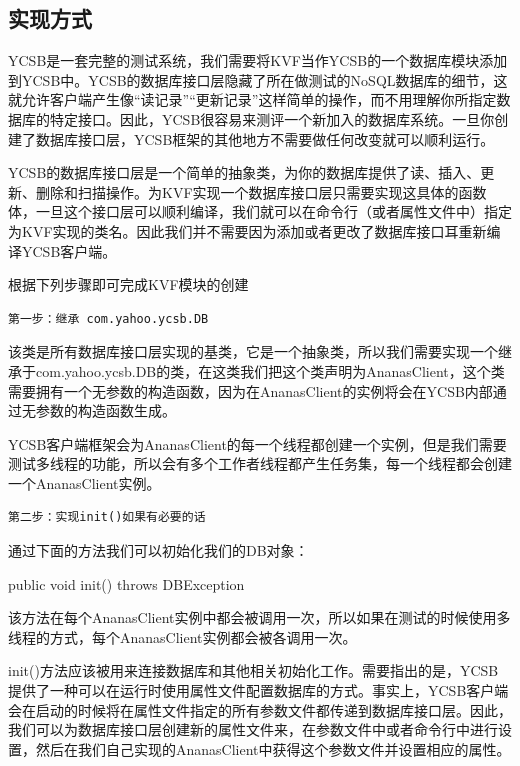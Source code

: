 	\subsection{实现方式}
		YCSB是一套完整的测试系统，我们需要将KVF当作YCSB的一个数据库模块添加到YCSB中。YCSB的数据库接口层隐藏了所在做测试的NoSQL数据库的细节，这就允许客户端产生像“读记录”“更新记录”这样简单的操作，而不用理解你所指定数据库的特定接口。因此，YCSB很容易来测评一个新加入的数据库系统。一旦你创建了数据库接口层，YCSB框架的其他地方不需要做任何改变就可以顺利运行。

		YCSB的数据库接口层是一个简单的抽象类，为你的数据库提供了读、插入、更新、删除和扫描操作。为KVF实现一个数据库接口层只需要实现这具体的函数体，一旦这个接口层可以顺利编译，我们就可以在命令行（或者属性文件中）指定为KVF实现的类名。因此我们并不需要因为添加或者更改了数据库接口耳重新编译YCSB客户端。

		根据下列步骤即可完成KVF模块的创建

		\begin{Verbatim}[frame = none]
    第一步：继承 com.yahoo.ycsb.DB		
		\end{Verbatim}

		该类是所有数据库接口层实现的基类，它是一个抽象类，所以我们需要实现一个继承于com.yahoo.ycsb.DB的类，在这类我们把这个类声明为AnanasClient，这个类需要拥有一个无参数的构造函数，因为在AnanasClient的实例将会在YCSB内部通过无参数的构造函数生成。

		YCSB客户端框架会为AnanasClient的每一个线程都创建一个实例，但是我们需要测试多线程的功能，所以会有多个工作者线程都产生任务集，每一个线程都会创建一个AnanasClient实例。

		\begin{Verbatim}[frame = none]
    第二步：实现init()如果有必要的话
		\end{Verbatim}
		
		通过下面的方法我们可以初始化我们的DB对象：

		public void init() throws DBException

		该方法在每个AnanasClient实例中都会被调用一次，所以如果在测试的时候使用多线程的方式，每个AnanasClient实例都会被各调用一次。

		init()方法应该被用来连接数据库和其他相关初始化工作。需要指出的是，YCSB提供了一种可以在运行时使用属性文件配置数据库的方式。事实上，YCSB客户端会在启动的时候将在属性文件指定的所有参数文件都传递到数据库接口层。因此，我们可以为数据库接口层创建新的属性文件来，在参数文件中或者命令行中进行设置，然后在我们自己实现的AnanasClient中获得这个参数文件并设置相应的属性。

